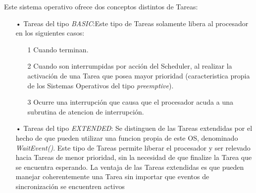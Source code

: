 \documentclass[12pt,letterpaper]{article}
\begin{document}
Este sistema operativo ofrece dos conceptos distintos de Tareas\cite{os223}:
\begin{enumerate}
\item[•]Tareas del tipo \emph{BASIC}:Este tipo de Tareas solamente libera al procesador en los siguientes casos:
\begin{enumerate}
\item[1]Cuando terminan.
\item[2]Cuando son interrumpidas por acción del Scheduler, al realizar la activación de una Tarea que posea mayor prioridad (caracteristica propia de los Sistemas Operativos del tipo \textit{preemptive}).
\item[3]Ocurre una interrupción que causa que el procesador acuda a una subrutina de atencion de interrupción.
\end{enumerate}
\item[•]Tareas del tipo \emph{EXTENDED}: Se distinguen de las Tareas extendidas por el hecho de que pueden utilizar una funcion propia de este OS, denominado \textit{WaitEvent()}. Este tipo de Tareas permite liberar el procesador y ser relevado hacia Tareas de menor prioridad, sin la necesidad de que finalize la Tarea que se encuentra esperando.
La ventaja de las Tareas extendidas es que pueden manejar coherentemente una Tarea sin importar que eventos de sincronización se encuentren activos%

\end{enumerate}
\end{document}
